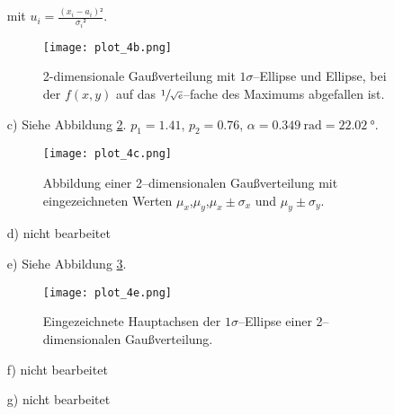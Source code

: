 \begin{itemize}
mit $u_i=\frac{(x_i-a_i)²}{{\sigma_i}²}$. 

\begin{figure}
\centering
\texttt{[image: plot\_4b.png]}
\caption{2-dimensionale Gaußverteilung mit $1\sigma$--Ellipse und Ellipse, bei der $f(x,y)$ auf das $\sfrac{1}{\sqrt{e}}$--fache des Maximums abgefallen ist.}
\label{fig:b}
\end{figure}

\item[c)] Siehe Abbildung \ref{fig:c}.
$p_1=1.41$, $p_2=0.76$, $\alpha=\SI{0.349}{\radian}=\SI{22.02}{\degree}$.
\begin{figure}
\centering
\texttt{[image: plot\_4c.png]}
\caption{Abbildung einer 2--dimensionalen Gaußverteilung mit eingezeichneten Werten $\mu_x$,$\mu_y$,$\mu_x\pm\sigma_x$ und $\mu_y\pm\sigma_y$.}
\label{fig:c}

\end{figure}
\item[d)] nicht bearbeitet
\item[e)] Siehe Abbildung \ref{fig:e}.
\begin{figure}
\centering
\texttt{[image: plot\_4e.png]}
\caption{Eingezeichnete Hauptachsen der $1\sigma$--Ellipse einer 2--dimensionalen Gaußverteilung.}
\label{fig:e}
\end{figure}
\item[f)] nicht bearbeitet
\item[g)] nicht bearbeitet
\end{itemize}
